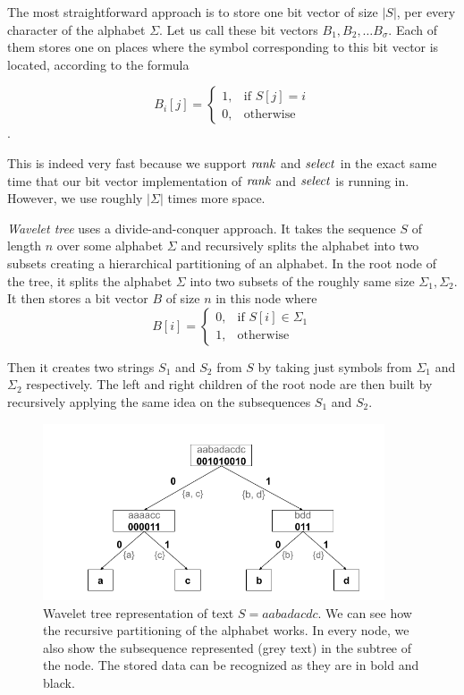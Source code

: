 The most straightforward approach is to store one bit vector of size $|S|$,
per every character of the alphabet $\Sigma$. Let us call these bit vectors $B_1,
B_2, \ldots B_{\sigma}$. Each of them stores one on places where the symbol corresponding
to this bit vector is located, according to the formula

\[
    B_i[j]= 
\begin{cases}
	1,& \text{if } S[j]=i \\
    0,& \text{otherwise}
\end{cases}
\].

This is indeed very fast because we support $\mathit{rank}$ and $\mathit{select}$ in the exact same time
that our bit vector implementation of $\mathit{rank}$ and $\mathit{select}$ is running in. However, we use
roughly $|\Sigma|$ times more space.

\textit{Wavelet tree} uses a divide-and-conquer approach. It takes the sequence $S$ of
length $n$ over some alphabet $\Sigma$ and recursively splits the alphabet into
two subsets creating a hierarchical partitioning of an alphabet. In the root node
of the tree, it splits the alphabet $\Sigma$ into two subsets of the roughly same
size $\Sigma_1, \Sigma_2$. It then stores a bit vector $B$ of size $n$ in this node
where
\[
    B[i]= 
\begin{cases}
    0,& \text{if } S[i]\in \Sigma_1\\
    1,              & \text{otherwise}
\end{cases}
\]

Then it creates two strings $S_1$ and $S_2$ from $S$ by taking just symbols
from $\Sigma_1$ and $\Sigma_2$ respectively. The left and right children of the root node
are then built by recursively applying the same idea on the subsequences $S_1$ and $S_2$.

\begin{figure}
	\centerline{
		\includegraphics[width=0.9\textwidth, height=0.3\textheight]{images/wavelet_tree}
	}
	\caption[TODO]{Wavelet tree representation of text $S=\mathit{aabadacdc}$. We can see how
	the recursive partitioning of the alphabet works. In every node, we also show the
	subsequence represented (grey text) in the subtree of the node. The stored data can be
	recognized as they are in bold and black.
	}
	\label{obr:WaveletTreeExample}
\end{figure}

